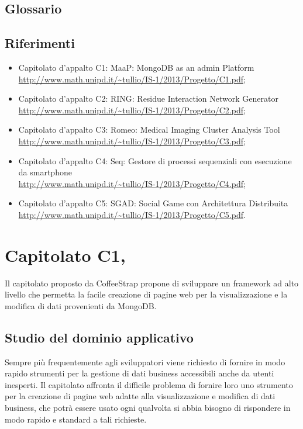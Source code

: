 \subsection{Glossario}%
\label{1.2}
\Glossario{}

\subsection{Riferimenti} %
\label{1.3}

\begin{itemize}
\item Capitolato d’appalto C1: MaaP: MongoDB as an admin Platform\\
\url{http://www.math.unipd.it/~tullio/IS-1/2013/Progetto/C1.pdf};
\item Capitolato d’appalto C2: RING: Residue Interaction Network Generator\\
\url{http://www.math.unipd.it/~tullio/IS-1/2013/Progetto/C2.pdf};
\item Capitolato d’appalto C3: Romeo: Medical Imaging Cluster Analysis Tool\\
\url{http://www.math.unipd.it/~tullio/IS-1/2013/Progetto/C3.pdf};
\item Capitolato d’appalto C4: Seq: Gestore di processi sequenziali con esecuzione da smartphone\\
\url{http://www.math.unipd.it/~tullio/IS-1/2013/Progetto/C4.pdf};
\item Capitolato d’appalto C5: SGAD: Social Game con Architettura Distribuita\\
\url{http://www.math.unipd.it/~tullio/IS-1/2013/Progetto/C5.pdf}.
\end{itemize}

\newpage
\section{Capitolato C1, \Progetto{}}%
\label{2}
Il capitolato proposto da CoffeeStrap propone di sviluppare un framework ad alto livello che permetta la facile creazione di pagine web per la visualizzazione e la modifica di dati provenienti da MongoDB.
\subsection{Studio del dominio applicativo} %
\label{2.1}
Sempre più frequentemente agli sviluppatori viene richiesto di fornire in modo rapido strumenti per la gestione di dati business accessibili anche da utenti inesperti.
Il capitolato affronta il difficile problema di fornire loro uno strumento per la creazione di pagine web adatte alla visualizzazione e modifica di dati business, che potrà essere usato ogni qualvolta si abbia bisogno di rispondere in modo rapido e standard a tali richieste.
